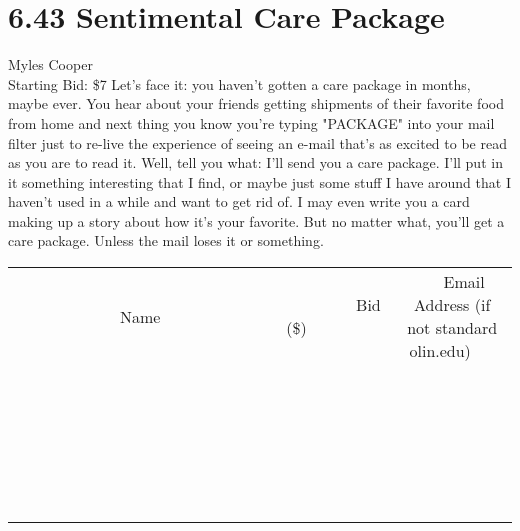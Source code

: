 \documentclass[11pt]{article}
\begin{document}
\section*{6.43 Sentimental Care Package}
Myles Cooper
\\
Starting Bid: \$7
\newline
Let's face it: you haven't gotten a care package in months, maybe ever. You hear about your friends getting shipments of their favorite food from home and next thing you know you're typing "PACKAGE" into your mail filter just to re-live the experience of seeing an e-mail that's as excited to be read as you are to read it. Well, tell you what: I'll send you a care package. I'll put in it something interesting that I find, or maybe just some stuff I have around that I haven't used in a while and want to get rid of. I may even write you a card making up a story about how it's your favorite. But no matter what, you'll get a care package. Unless the mail loses it or something.
\\[6ex]
\begin{tabular}{c c c}
~~~~~~~~~~~~~Name~~~~~~~~~~~~~ & ~~~~~~~~~Bid (\$)~~~~~~~~~  & ~~~Email Address (if not standard olin.edu)~~~\\
 & & \\
\hline
 & & \\
\hline
 & & \\
\hline
 & & \\
\hline
 & & \\
\hline
 & & \\
\hline
 & & \\
\hline
 & & \\
\hline
 & & \\
\hline
 & & \\
\hline
 & & \\
\hline
 & & \\
\hline
 & & \\
\hline
 & & \\
\hline
 & & \\
\hline
 & & \\
\hline
 & & \\
\hline
 & & \\
\hline
 & & \\
\hline
 & & \\
\hline
 & & \\
\hline
 & & \\
\hline
 & & \\
\hline
 & & \\
\hline
 & & \\
\hline
 & & \\
\hline
\end{tabular}
\newpage
\end{document}

